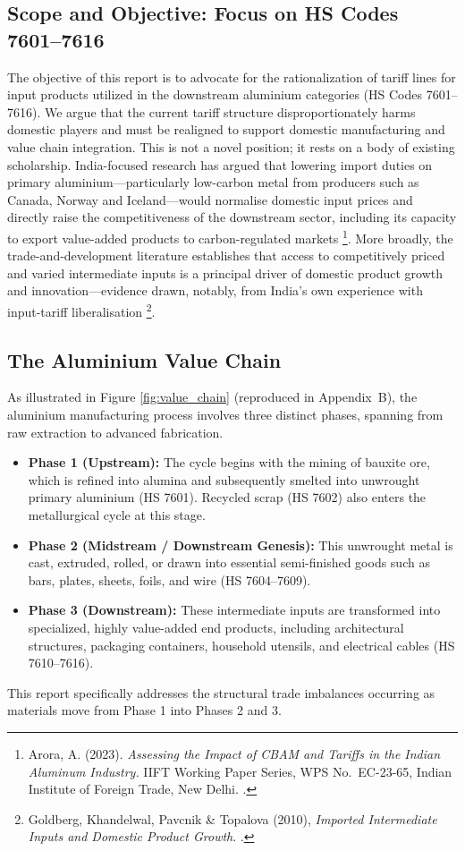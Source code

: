 \documentclass[11pt, a4paper]{article}
\numberwithin{figure}{section}
\numberwithin{table}{section}
\begin{document}
\subsection{Scope and Objective: Focus on HS Codes 7601--7616}
The objective of this report is to advocate for the rationalization of tariff lines for input products utilized in the downstream aluminium categories (HS Codes 7601--7616). We argue that the current tariff structure disproportionately harms domestic players and must be realigned to support domestic manufacturing and value chain integration. This is not a novel position; it rests on a body of existing scholarship. India-focused research has argued that lowering import duties on primary aluminium---particularly low-carbon metal from producers such as Canada, Norway and Iceland---would normalise domestic input prices and directly raise the competitiveness of the downstream sector, including its capacity to export value-added products to carbon-regulated markets \cite{arora2023}\footnote{Arora, A. (2023). \textit{Assessing the Impact of CBAM and Tariffs in the Indian Aluminum Industry.} IIFT Working Paper Series, WPS No.~EC-23-65, Indian Institute of Foreign Trade, New Delhi. \cite{arora2023}.}. More broadly, the trade-and-development literature establishes that access to competitively priced and varied intermediate inputs is a principal driver of domestic product growth and innovation---evidence drawn, notably, from India's own experience with input-tariff liberalisation \cite{goldberg2010}\footnote{Goldberg, Khandelwal, Pavcnik \& Topalova (2010), \textit{Imported Intermediate Inputs and Domestic Product Growth}. \cite{goldberg2010}.}.

\subsection{The Aluminium Value Chain}
As illustrated in Figure \ref{fig:value_chain} (reproduced in Appendix~B), the aluminium manufacturing process involves three distinct phases, spanning from raw extraction to advanced fabrication.

\begin{itemize}
    \item \textbf{Phase 1 (Upstream):} The cycle begins with the mining of bauxite ore, which is refined into alumina and subsequently smelted into unwrought primary aluminium (HS 7601). Recycled scrap (HS 7602) also enters the metallurgical cycle at this stage.
    \item \textbf{Phase 2 (Midstream / Downstream Genesis):} This unwrought metal is cast, extruded, rolled, or drawn into essential semi-finished goods such as bars, plates, sheets, foils, and wire (HS 7604--7609).
    \item \textbf{Phase 3 (Downstream):} These intermediate inputs are transformed into specialized, highly value-added end products, including architectural structures, packaging containers, household utensils, and electrical cables (HS 7610--7616).
\end{itemize}
This report specifically addresses the structural trade imbalances occurring as materials move from Phase 1 into Phases 2 and 3.
\end{document}
